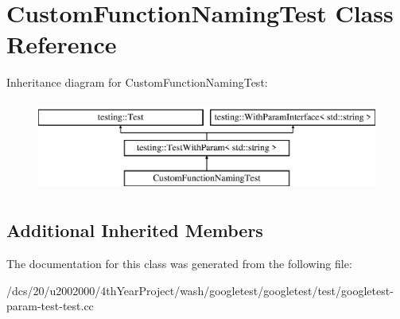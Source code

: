 \hypertarget{classCustomFunctionNamingTest}{}\section{Custom\+Function\+Naming\+Test Class Reference}
\label{classCustomFunctionNamingTest}
Inheritance diagram for Custom\+Function\+Naming\+Test\+:\begin{figure}[H]
\begin{center}
\leavevmode
\includegraphics[height=3.000000cm]{classCustomFunctionNamingTest}
\end{center}
\end{figure}
\subsection*{Additional Inherited Members}


The documentation for this class was generated from the following file\+:\begin{DoxyCompactItemize}
\item 
/dcs/20/u2002000/4th\+Year\+Project/wash/googletest/googletest/test/googletest-\/param-\/test-\/test.\+cc\end{DoxyCompactItemize}
